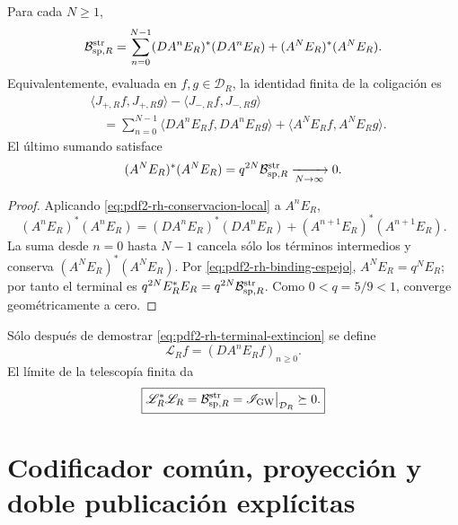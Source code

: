 \begin{proposition}
\label{prop:pdf2-rh-telescopia}
Para cada \(N\geq1\),
\begin{equation}\label{eq:pdf2-rh-telescopia-finita}
 \mathcal B_{{\rm sp},R}^{\rm str}
 =\sum_{n=0}^{N-1}(DA^nE_R)^*(DA^nE_R)
 +(A^NE_R)^*(A^NE_R).
\end{equation}
Equivalentemente, evaluada en \(f,g\in\mathcal D_R\), la identidad finita de
la coligación es
\begin{equation}\label{eq:pdf2-rh-balance-finito-columnas}
\boxed{
\begin{aligned}
 &\langle J_{+,R}f,J_{+,R}g\rangle
  -\langle J_{-,R}f,J_{-,R}g\rangle\\
 &\quad=\sum_{n=0}^{N-1}
  \langle DA^nE_Rf,DA^nE_Rg\rangle
  +\langle A^NE_Rf,A^NE_Rg\rangle.
\end{aligned}}
\end{equation}
El último sumando satisface
\begin{equation}\label{eq:pdf2-rh-terminal-extincion}
 (A^NE_R)^*(A^NE_R)
 =q^{2N}\mathcal B_{{\rm sp},R}^{\rm str}
 \xrightarrow[N\to\infty]{}0.
\end{equation}
\end{proposition}

\begin{proof}
Aplicando \eqref{eq:pdf2-rh-conservacion-local} a \(A^nE_R\),
\[
 (A^nE_R)^*(A^nE_R)
 =(DA^nE_R)^*(DA^nE_R)
 +(A^{n+1}E_R)^*(A^{n+1}E_R).
\]
La suma desde \(n=0\) hasta \(N-1\) cancela sólo los términos intermedios y
conserva \((A^NE_R)^*(A^NE_R)\). Por
\eqref{eq:pdf2-rh-binding-espejo}, \(A^NE_R=q^NE_R\); por tanto el terminal
es \(q^{2N}E_R^*E_R=q^{2N}\mathcal B_{{\rm sp},R}^{\rm str}\). Como
\(0<q=5/9<1\), converge geométricamente a cero.
\end{proof}

Sólo después de demostrar \eqref{eq:pdf2-rh-terminal-extincion} se define
\begin{equation}\label{eq:pdf2-rh-l-r}
 \mathscr L_Rf=(DA^nE_Rf)_{n\geq0}.
\end{equation}
El límite de la telescopía finita da
\begin{equation}\label{eq:pdf2-rh-lstar-l}
 \boxed{
 \mathscr L_R^*\mathscr L_R
 =\mathcal B_{{\rm sp},R}^{\rm str}
 =\mathscr I_{\rm GW}\big|_{\mathcal D_R}\succeq0.}
\end{equation}

\section{Codificador común, proyección y doble publicación explícitas}

